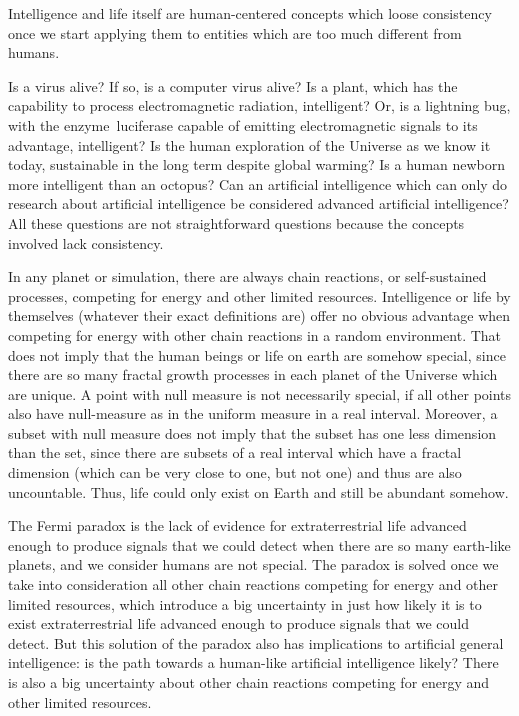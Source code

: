 \documentclass[11pt]{book}
\begin{document}
Intelligence and life itself\cite{article} are human-centered concepts which loose consistency once we start
applying them to entities which are too much different from humans.

Is a virus alive? If so, is a computer virus alive? Is a plant, which
has the capability to process electromagnetic radiation, intelligent?
Or, is a lightning bug, with the enzyme~luciferase capable of emitting
electromagnetic signals to its advantage, intelligent? Is the human
exploration of the Universe as we know it today, sustainable in the long
term despite global warming? Is a human newborn more intelligent than an
octopus? Can an artificial intelligence which can only do research about
artificial intelligence be considered advanced artificial intelligence?
All these questions are not straightforward questions because the
concepts involved lack consistency.

In any planet or simulation, there are always chain reactions, or
self-sustained processes, competing for energy and other limited
resources. Intelligence or life by themselves (whatever their exact
definitions are) offer no obvious advantage when competing for energy
with other chain reactions in a random environment. That does not imply
that the human beings or life on earth are somehow special, since there
are so many fractal growth processes in each planet of the Universe
which are unique. A point with null measure is not necessarily special,
if all other points also have null-measure as in the uniform measure in
a real interval. Moreover, a subset with null measure does not imply
that the subset has one less dimension than the set, since there are
subsets of a real interval which have a fractal dimension (which can be
very close to one, but not one) and thus are also uncountable. Thus,
life could only exist on Earth and still be abundant somehow.

The Fermi paradox is the lack of evidence for extraterrestrial life
advanced enough to produce signals that we could detect when there are
so many earth-like planets, and we consider humans are not special. The
paradox is solved once we take into consideration all other chain
reactions competing for energy and other limited resources, which
introduce a big uncertainty in just how likely it is to exist
extraterrestrial life advanced enough to produce signals that we could
detect. But this solution of the paradox also has implications to
artificial general intelligence: is the path towards a human-like
artificial intelligence likely? There is also a big uncertainty about
other chain reactions competing for energy and other limited
resources\cite{kaminski2019right}.
\end{document}
